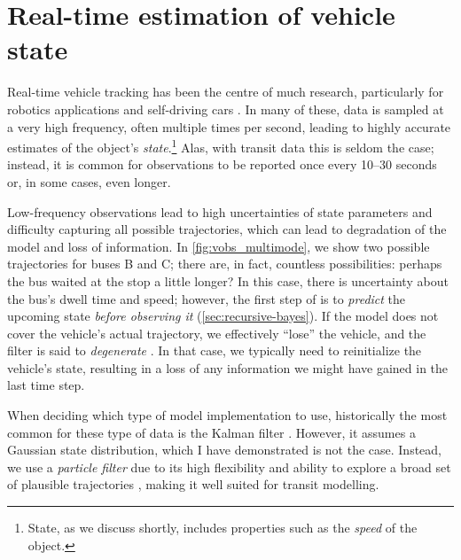 \section{Real-time estimation of vehicle state}
\label{sec:vehicle_model}

Real-time vehicle tracking has been the centre of much research, particularly for robotics applications and self-driving cars \citep{Daum_2005, Gustafsson_2002}. In many of these, data is sampled at a very high frequency, often multiple times per second, leading to highly accurate estimates of the object's \emph{state}.\footnote{State, as we discuss shortly, includes properties such as the \emph{speed} of the object.} Alas, with transit data this is seldom the case; instead, it is common for observations to be reported once every 10--30 seconds or, in some cases, even longer.

Low-frequency observations lead to high uncertainties of state parameters and difficulty capturing all possible trajectories, which can lead to degradation of the model and loss of information. In \cref{fig:vobs_multimode}, we show two possible trajectories for buses B and C; there are, in fact, countless possibilities: perhaps the bus waited at the stop a little longer? In this case, there is uncertainty about the bus's dwell time and speed; however, the first step of  is to \emph{predict} the upcoming state \emph{before observing it} (\cref{sec:recursive-bayes}). If the model does not cover the vehicle's actual trajectory, we effectively ``lose'' the vehicle, and the filter is said to \emph{degenerate} \citep{Chen_2014}. In that case, we typically need to reinitialize the vehicle's state, resulting in a loss of any information we might have gained in the last time step.

When deciding which type of model implementation to use, historically the most common for these type of data is the Kalman filter \citep{Wall_1999, Dailey_2001, Cathey_2003}. However, it assumes a Gaussian state distribution, which I have demonstrated is not the case. Instead, we use a \emph{particle filter} due to its high flexibility and ability to explore a broad set of plausible trajectories \citep{Hans_2015}, making it well suited for transit modelling.

